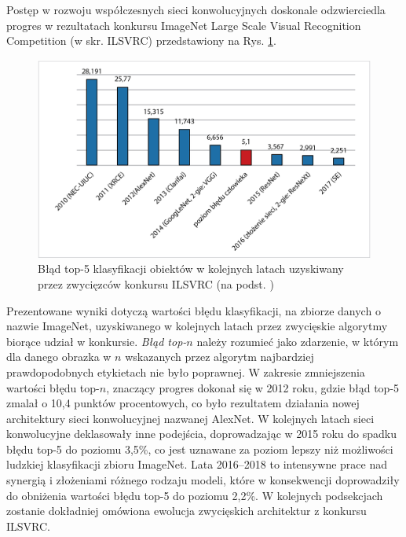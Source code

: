 Postęp w rozwoju współczesnych sieci konwolucyjnych doskonale odzwierciedla progres w rezultatach konkursu ImageNet Large Scale Visual Recognition Competition (w skr. ILSVRC) przedstawiony na Rys. \ref{ILSVRC}.
\begin{figure}[t!]
	\centering
	\includegraphics[width=1\textwidth]{figures/ILSVRC.jpg}
	\caption{Błąd top-5 klasyfikacji obiektów w kolejnych latach uzyskiwany przez zwycięzców konkursu ILSVRC (na podst. \cite{imagenet_cvpr09})}
	\label{ILSVRC}
\end{figure}
Prezentowane wyniki dotyczą wartości błędu klasyfikacji, na zbiorze danych \cite{imagenet_cvpr09} o nazwie ImageNet, uzyskiwanego w kolejnych latach przez zwycięskie algorytmy biorące udział w konkursie. \textit{Błąd top-$n$} należy rozumieć jako zdarzenie, w którym dla danego obrazka w $n$ wskazanych przez algorytm najbardziej prawdopodobnych etykietach nie było poprawnej. W zakresie zmniejszenia wartości błędu top-$n$, znaczący progres dokonał się w 2012 roku, gdzie błąd top-5 zmalał o 10,4 punktów procentowych, co było rezultatem działania nowej architektury sieci konwolucyjnej nazwanej AlexNet. W kolejnych latach sieci konwolucyjne deklasowały inne podejścia, doprowadzając w 2015 roku do spadku błędu top-5 do poziomu 3,5\%, co jest uznawane za poziom lepszy niż możliwości ludzkiej klasyfikacji zbioru ImageNet. Lata 2016--2018 to intensywne prace nad synergią i złożeniami różnego rodzaju modeli, które w konsekwencji doprowadziły \linebreak do obniżenia wartości błędu top-5 do poziomu 2,2\%. W kolejnych podsekcjach zostanie dokładniej omówiona ewolucja zwycięskich architektur z konkursu ILSVRC. 

